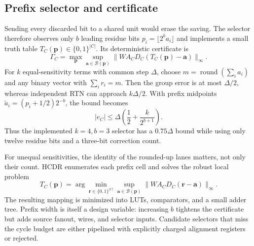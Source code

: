 \documentclass[conference]{IEEEtran}
\newcommand{\vect}[1]{\bm{#1}}
\newcommand{\round}{\operatorname{round}}
\begin{document}
\subsection{Prefix selector and certificate}
Sending every discarded bit to a shared unit would erase the saving. The
selector therefore observes only $b$ leading residue bits
$p_i=\lfloor2^ba_i\rfloor$ and implements a small truth table
$T_C(\vect p)\in\{0,1\}^{|C|}$. Its deterministic certificate is
\begin{equation}
 \Gamma_C=\max_{\vect p}\sup_{\vect a\in\mathcal B(\vect p)}
 \|WA_CD_C(T_C(\vect p)-\vect a)\|_\infty .
 \label{eq:cert}
\end{equation}
For $k$ equal-sensitivity terms with common step $\Delta$, choose
$m=\round(\sum_i a_i)$ and any binary vector with $\sum_i r_i=m$. Then the
group error is at most $\Delta/2$, whereas independent RTN can approach
$k\Delta/2$. With prefix midpoints
$\tilde a_i=(p_i+1/2)2^{-b}$, the bound becomes
\begin{equation}
 |e_C|\le \Delta\left(\frac12+\frac{k}{2^{b+1}}\right).
 \label{eq:prefixbound}
\end{equation}
Thus the implemented $k=4,b=3$ selector has a $0.75\Delta$ bound while using
only twelve residue bits and a three-bit correction count.

For unequal sensitivities, the identity of the rounded-up lanes matters, not
only their count. HCDR enumerates each prefix cell and solves the robust local
problem
\begin{equation}
 T_C(\vect p)=\arg\min_{\vect r\in\{0,1\}^{|C|}}
 \sup_{\vect a\in\mathcal B(\vect p)}
 \|WA_CD_C(\vect r-\vect a)\|_\infty .
 \label{eq:robustcell}
\end{equation}
The resulting mapping is minimized into LUTs, comparators, and a small adder
tree. Prefix width is itself a design variable: increasing $b$ tightens the
certificate but adds source fanout, wires, and selector inputs. Candidate
selectors that miss the cycle budget are either pipelined with explicitly
charged alignment registers or rejected.
\end{document}
